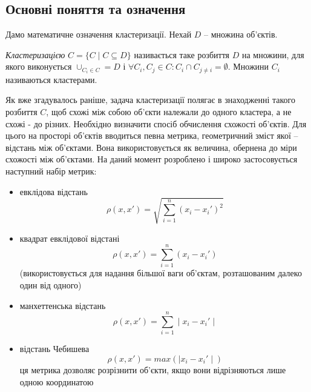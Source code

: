 \subsection{Основні поняття та означення}
    Дамо математичне означення кластеризації. Нехай $D$ -- множина об'єктів. 
    \begin{definition}
        \emph{Кластеризацією} $C = \{C \mid C \subseteq D\}$ називається таке розбиття $D$ на множини, 
        для якого виконується $\cup_{C_i \in C} = D$ і $\forall C_i, C_j \in C : C_i \cap C_{j \neq i} = \emptyset$. 
        Множини $C_i$ називаються кластерами.
    \end{definition}
    Як вже згадувалось раніше, задача кластеризації полягає в знаходженні такого розбиття $C$, щоб схожі між собою об'єкти належали до одного кластера, а не схожі - до різних. Необхідно визначити спосіб обчислення схожості об'єктів.
    Для цього на просторі об'єктів вводиться певна метрика, геометричний зміст якої -- відстань між об'єктами. Вона використовується як величина, обернена до міри схожості між об'єктами. На даний момент розроблено і широко застосовується наступний набір метрик:
    \begin{itemize}
        \item {евклідова відстань} 
            \[ 
                \rho(x, x') = \sqrt{ \sum_{i=1}^n (x_i - x_i')^2}
            \]
        \item {квадрат евклідової відстані} 
            \[
                \rho(x, x') = \sum_{i=1}^n (x_i - x_i')
            \]            
            (використовується для надання більшої ваги об'єктам, розташованим далеко один від одного)
        \item {манхеттенська відстань} 
            \[
                \rho(x, x') = \sum_{i=1}^n \mid x_i - x_i' \mid
            \]
        \item {відстань Чебишева}
            \[
                \rho(x, x') = max(\mid x_i - x_i' \mid )
            \]            
            ця метрика дозволяє розрізнити об'єкти, якщо вони відрізняються лише одною координатою
    \end{itemize}
    
